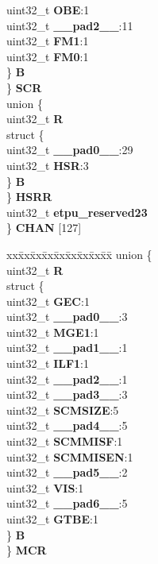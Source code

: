 \begin{DoxyCompactItemize}
\begin{tabbing}
\>\>\>uint32\_t {\bfseries OBE}:1\\
\>\>\>uint32\_t {\bfseries \_\_pad2\_\_}:11\\
\>\>\>uint32\_t {\bfseries FM1}:1\\
\>\>\>uint32\_t {\bfseries FM0}:1\\
\>\>\} {\bfseries B}\\
\>\} {\bfseries SCR}\\
\>union \{\\
\>\>uint32\_t {\bfseries R}\\
\>\>struct \{\\
\>\>\>uint32\_t {\bfseries \_\_pad0\_\_}:29\\
\>\>\>uint32\_t {\bfseries HSR}:3\\
\>\>\} {\bfseries B}\\
\>\} {\bfseries HSRR}\\
\>uint32\_t {\bfseries etpu\_reserved23}\\
\} {\bfseries CHAN} \mbox{[}127\mbox{]}\\

\end{tabbing}\item 
\mbox{\label{structETPU__tag_a47181aaadff2bcbb95c0c7594f259c98}} 
\begin{tabbing}
xx\=xx\=xx\=xx\=xx\=xx\=xx\=xx\=xx\=\kill
union \{\\
\>uint32\_t {\bfseries R}\\
\>struct \{\\
\>\>uint32\_t {\bfseries GEC}:1\\
\>\>uint32\_t {\bfseries \_\_pad0\_\_}:3\\
\>\>uint32\_t {\bfseries MGE1}:1\\
\>\>uint32\_t {\bfseries \_\_pad1\_\_}:1\\
\>\>uint32\_t {\bfseries ILF1}:1\\
\>\>uint32\_t {\bfseries \_\_pad2\_\_}:1\\
\>\>uint32\_t {\bfseries \_\_pad3\_\_}:3\\
\>\>uint32\_t {\bfseries SCMSIZE}:5\\
\>\>uint32\_t {\bfseries \_\_pad4\_\_}:5\\
\>\>uint32\_t {\bfseries SCMMISF}:1\\
\>\>uint32\_t {\bfseries SCMMISEN}:1\\
\>\>uint32\_t {\bfseries \_\_pad5\_\_}:2\\
\>\>uint32\_t {\bfseries VIS}:1\\
\>\>uint32\_t {\bfseries \_\_pad6\_\_}:5\\
\>\>uint32\_t {\bfseries GTBE}:1\\
\>\} {\bfseries B}\\
\} {\bfseries MCR}\\


\end{tabbing}
\end{DoxyCompactItemize}
